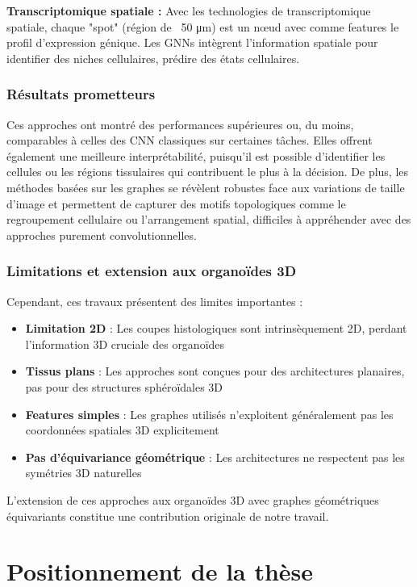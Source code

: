 \textbf{Transcriptomique spatiale :}
Avec les technologies de transcriptomique spatiale, chaque "spot" (région de ~50 μm) est un nœud avec comme features le profil d'expression génique. Les GNNs intègrent l'information spatiale pour identifier des niches cellulaires, prédire des états cellulaires.

\subsubsection{Résultats prometteurs}

Ces approches ont montré des performances supérieures ou, du moins, comparables à celles des CNN classiques sur certaines tâches. Elles offrent également une meilleure interprétabilité, puisqu’il est possible d’identifier les cellules ou les régions tissulaires qui contribuent le plus à la décision. De plus, les méthodes basées sur les graphes se révèlent robustes face aux variations de taille d’image et permettent de capturer des motifs topologiques comme le regroupement cellulaire ou l’arrangement spatial, difficiles à appréhender avec des approches purement convolutionnelles.

\subsubsection{Limitations et extension aux organoïdes 3D}

Cependant, ces travaux présentent des limites importantes :
\begin{itemize}
    \item \textbf{Limitation 2D} : Les coupes histologiques sont intrinsèquement 2D, perdant l'information 3D cruciale des organoïdes
    \item \textbf{Tissus plans} : Les approches sont conçues pour des architectures planaires, pas pour des structures sphéroïdales 3D
    \item \textbf{Features simples} : Les graphes utilisés n'exploitent généralement pas les coordonnées spatiales 3D explicitement
    \item \textbf{Pas d'équivariance géométrique} : Les architectures ne respectent pas les symétries 3D naturelles
\end{itemize}

L'extension de ces approches aux organoïdes 3D avec graphes géométriques équivariants constitue une contribution originale de notre travail.

\section{Positionnement de la thèse}

